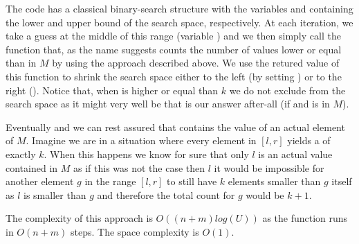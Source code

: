 The code has a classical binary-search structure with the variables  and  containing the lower and upper bound of the search space, respectively. At each iteration, we take a guess at the middle of this range (variable ) and we then simply call the function  that, as the name suggests counts the number of values lower or equal than  in $M$ by using the approach described above.
We use the retured value of this function to shrink the search space either to the left (by setting ) or to the right (). Notice that, when  is higher or equal than $k$ we do not exclude  from the search space as it might very well be that  is our answer after-all (if  and  is in $M$).

Eventually  and we can rest assured that  contains the value of an actual element of $M$. 
Imagine we are in a situation where every element in $[l,r]$ yields a  of exactly $k$. When this happens we know for sure that only $l$ is an actual value contained in $M$ as if this was not the case then $l$ it would be impossible for another element $g$ in the range $[l,r]$ to still have $k$ elements smaller than $g$ itself as $l$ is smaller than $g$ and therefore the total count for $g$ would be $k+1$.

The complexity of this approach is $O((n+m)log(U))$ as the function  runs in $O(n+m)$ steps. The space complexity is $O(1)$.